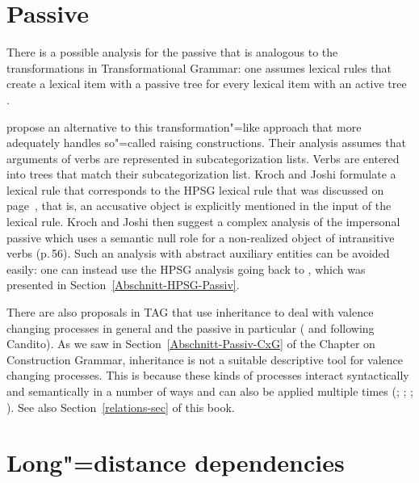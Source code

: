 \section{Passive}

There is a possible analysis for the passive that is analogous to the transformations in Transformational Grammar: one assumes lexical rules that
create a lexical item with a passive tree for every lexical item with an active tree \citep[--51]{KJ85a}. 

\citet[]{KJ85a} propose an alternative to this transformation"=like approach that more adequately handles so"=called raising constructions.
Their analysis assumes that arguments of verbs are represented in subcategorization lists. Verbs are entered into trees that match their subcategorization
list. Kroch and Joshi formulate a lexical rule that corresponds to the HPSG lexical rule that was discussed on page~\pageref{pass-lr-mlr}, that is,
an accusative object is explicitly mentioned in the input of the lexical rule. Kroch and Joshi then suggest a complex analysis of the impersonal passive which
uses a semantic null role for a non-realized object of intransitive verbs (p.\,56). Such an analysis
with abstract auxiliary entities can be avoided easily: one can instead use the HPSG\indexhpsg
analysis going back to \citet{Haider86}, which was presented in Section~\ref{Abschnitt-HPSG-Passiv}.
\largerpage

There are also proposals in TAG that use inheritance to deal with valence changing processes 
in general and the passive in particular (\citealp{Candito96a} and \citealp*{KSYJ2006a} following Candito). As we saw in Section~\ref{Abschnitt-Passiv-CxG} of 
the Chapter on Construction Grammar, inheritance is not a suitable descriptive tool for valence changing processes. This is because these kinds of processes
interact syntactically and semantically in a number of ways and can also be applied multiple times
(\citealp{Mueller2006d,Mueller2007d}; \citeyear[Section~7.5.2]{MuellerLehrbuch1};
\citeyear{MuellerUnifying}; \citeyear{MWArgSt}). See also Section~\ref{relations-sec} of this book.%

\section{Long"=distance dependencies}
\label{TAG-Fernabh}

